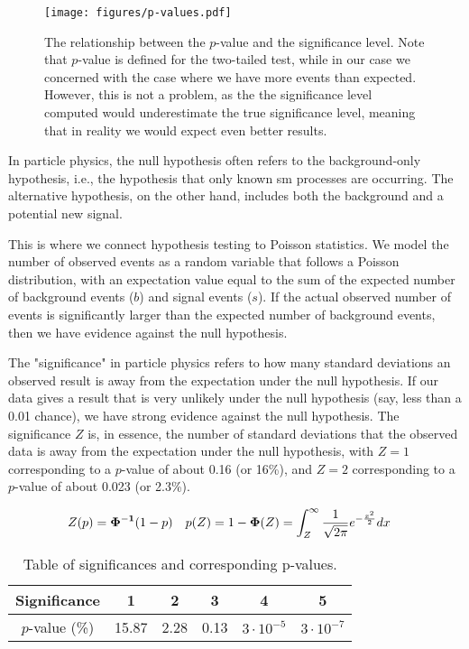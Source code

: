 \begin{figure}[htb]
    \centering
    \texttt{[image: figures/p-values.pdf]}
    \caption[The relationship between the $p$-value and the significance level.]
    {The relationship between the $p$-value and the significance level. Note that $p$-value is defined for the
        two-tailed test, while in our case we concerned with the case where we have more events than expected. However,
        this is not a problem, as the the significance level computed would underestimate the true significance level,
        meaning that in reality we would expect even better results.}
    \label{fig:p-values}
\end{figure}

In particle physics, the null hypothesis often refers to the background-only hypothesis, i.e., the hypothesis that only
known \gls{sm} processes are occurring. The alternative hypothesis, on the other hand, includes both the
background and a potential new signal.

This is where we connect hypothesis testing to Poisson statistics. We model the number of observed events as a random
variable that follows a Poisson distribution, with an expectation value equal to the sum of the expected number of
background events ($b$) and signal events ($s$). If the actual observed number of events is significantly larger than the
expected number of background events, then we have evidence against the null hypothesis.

The "significance" in particle physics refers to how many standard deviations an observed result is away from the
expectation under the null hypothesis. If our data gives a result that is very unlikely under the null hypothesis (say,
less than a 0.01 chance), we have strong evidence against the null hypothesis. The significance $Z$ is, in essence, the
number of standard deviations that the observed data is away from the expectation under the null hypothesis, with $Z = 1$
corresponding to a $p$-value of about 0.16 (or 16\%), and $Z = 2$ corresponding to a $p$-value of about 0.023 (or 2.3\%).

\begin{align}
    Z(p) & = \mathbf{\Phi^{-1}}(1 - p) & p(Z) & = 1 - \mathbf{\Phi}(Z) = \int_{Z}^{\infty} \frac{1}{\sqrt{2\pi}} e^{-\frac{x^2}{2}} dx
\end{align}

\begin{table}[htb]
    \centering
    \begin{tabular}{|c|c|c|c|c|c|}
        \hline
        Significance   & 1     & 2    & 3    & 4                 & 5                 \\
        \hline
        \rule{0pt}{15pt}
        $p$-value (\%) & 15.87 & 2.28 & 0.13 & $3 \cdot 10^{-5}$ & $3 \cdot 10^{-7}$ \\
        \hline
    \end{tabular}
    \caption{Table of significances and corresponding p-values.}
    \label{tab:significance}
\end{table}

